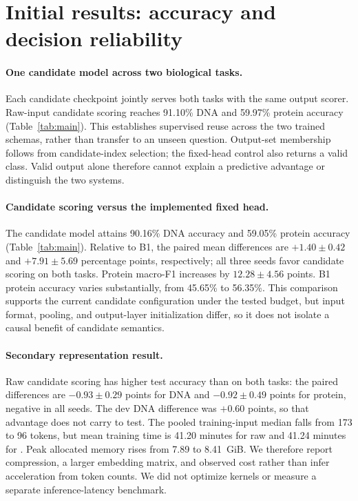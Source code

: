 \section{Initial results: accuracy and decision reliability}
\begin{table}[t]
\centering\small

\caption{Fixed-checkpoint test results (\%, mean $\pm$ sample SD over three seeds). F1 is macro-F1 over the fixed class set. All models use the same eligible examples.}
\label{tab:main}
\end{table}
\paragraph{One candidate model across two biological tasks.}
Each candidate checkpoint jointly serves both tasks with the same output scorer. Raw-input candidate scoring reaches 91.10\% DNA and 59.97\% protein accuracy (Table~\ref{tab:main}). This establishes supervised reuse across the two trained schemas, rather than transfer to an unseen question. Output-set membership follows from candidate-index selection; the fixed-head control also returns a valid class. Valid output alone therefore cannot explain a predictive advantage or distinguish the two systems.

\paragraph{Candidate scoring versus the implemented fixed head.}
The \BioBPE{} candidate model attains 90.16\% DNA accuracy and 59.05\% protein accuracy (Table~\ref{tab:main}). Relative to B1, the paired mean differences are $+1.40\pm0.42$ and $+7.91\pm5.69$ percentage points, respectively; all three seeds favor candidate scoring on both tasks. Protein macro-F1 increases by $12.28\pm4.56$ points. B1 protein accuracy varies substantially, from 45.65\% to 56.35\%. This comparison supports the current candidate configuration under the tested budget, but input format, pooling, and output-layer initialization differ, so it does not isolate a causal benefit of candidate semantics.

\paragraph{Secondary representation result.}
Raw candidate scoring has higher test accuracy than \BioBPE{} on both tasks: the paired \BioBPE{} differences are $-0.93\pm0.29$ points for DNA and $-0.92\pm0.49$ points for protein, negative in all seeds. The dev DNA difference was $+0.60$ points, so that advantage does not carry to test. The pooled training-input median falls from 173 to 96 tokens, but mean training time is 41.20 minutes for raw and 41.24 minutes for \BioBPE{}. Peak allocated memory rises from 7.89 to 8.41~GiB. We therefore report compression, a larger embedding matrix, and observed cost rather than infer acceleration from token counts. We did not optimize kernels or measure a separate inference-latency benchmark.

